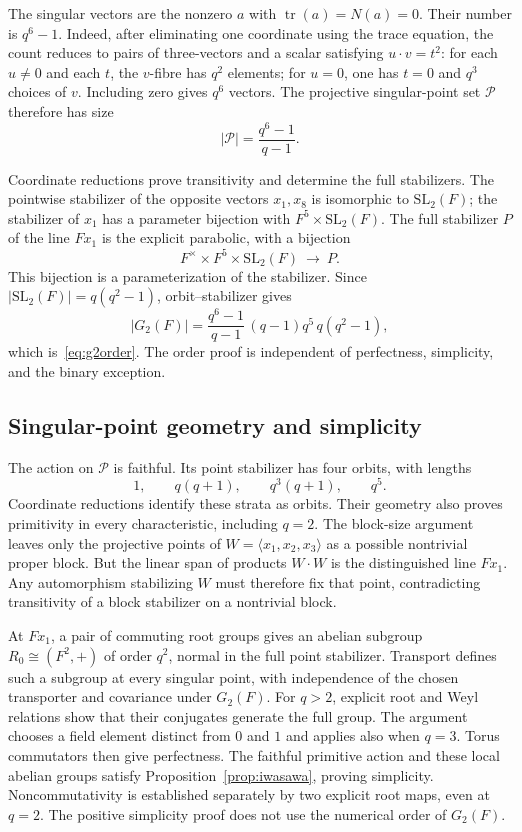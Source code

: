 \documentclass[11pt]{article}
\numberwithin{equation}{section}
\theoremstyle{definition}
\newcommand{\SL}{\mathrm{SL}}
\begin{document}
The singular vectors are the nonzero $a$ with
$\operatorname{tr}(a)=N(a)=0$. Their number is $q^6-1$.
Indeed, after eliminating one coordinate using the trace equation,
the count reduces to pairs of three-vectors and a scalar satisfying
$u\cdot v=t^2$: for each $u\ne0$ and each $t$, the $v$-fibre has
$q^2$ elements; for $u=0$, one has $t=0$ and $q^3$ choices of $v$.
Including zero gives $q^6$ vectors. The projective singular-point set
$\mathcal P$ therefore has size
\[
 |\mathcal P|=\frac{q^6-1}{q-1}.
\]

Coordinate reductions prove transitivity and determine the full
stabilizers. The pointwise stabilizer of the opposite vectors $x_1,x_8$
is isomorphic to $\SL_2(F)$; the stabilizer of $x_1$ has a parameter
bijection with $F^5\times\SL_2(F)$. The full stabilizer $P$ of the
line $Fx_1$ is the explicit parabolic, with a bijection
\[
 F^{\times}\times F^5\times\SL_2(F)\ \longrightarrow\ P.
\]
This bijection is a parameterization of the stabilizer. Since $|\SL_2(F)|=q(q^2-1)$, orbit--stabilizer gives
\[
 |G_2(F)|=\frac{q^6-1}{q-1}\,(q-1)q^5\,q(q^2-1),
\]
which is~\eqref{eq:g2order}. The order proof is independent of
perfectness, simplicity, and the binary exception.

\subsection{Singular-point geometry and simplicity}

The action on $\mathcal P$ is faithful. Its point stabilizer has four
orbits, with lengths
\begin{equation}\label{eq:g2subdegrees}
 1,\qquad q(q+1),\qquad q^3(q+1),\qquad q^5.
\end{equation}
Coordinate reductions identify these strata as orbits. Their geometry
also proves primitivity in every characteristic,
including $q=2$. The block-size argument leaves only the projective
points of $W=\langle x_1,x_2,x_3\rangle$ as a possible nontrivial
proper block. But the linear span of products $W\cdot W$ is the
distinguished line $Fx_1$. Any automorphism stabilizing $W$ must
therefore fix that point, contradicting transitivity of a block
stabilizer on a nontrivial block.

At $Fx_1$, a pair of commuting root groups gives an abelian subgroup
$R_0\cong(F^2,+)$ of order $q^2$, normal in the full point stabilizer.
Transport defines such a subgroup at every singular point, with
independence of the chosen transporter and covariance under $G_2(F)$.
For $q>2$, explicit root and Weyl relations show that their conjugates
generate the full group. The argument chooses a field element distinct
from $0$ and $1$ and applies also when $q=3$. Torus commutators then
give perfectness. The faithful primitive action and these local
abelian groups satisfy Proposition~\ref{prop:iwasawa}, proving simplicity.
Noncommutativity is established separately by two explicit root maps,
even at $q=2$. The positive simplicity proof does not use the numerical
order of $G_2(F)$.
\end{document}
